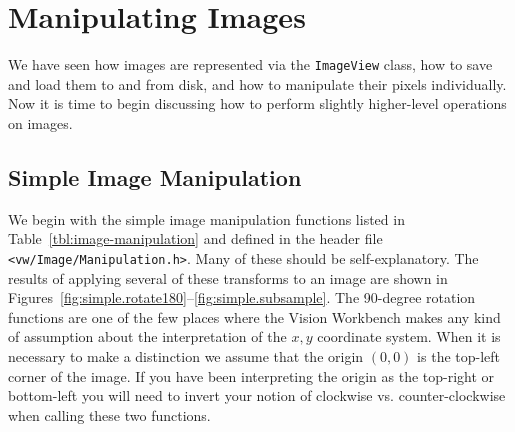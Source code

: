 \section{Manipulating Images}

We have seen how images are represented via the \verb#ImageView#
class, how to save and load them to and from disk, and how to
manipulate their pixels individually.  Now it is time to begin 
discussing how to perform slightly higher-level operations on images.

\subsection{Simple Image Manipulation}
\label{sec:simple-image-manipulation}

We begin with the simple image manipulation functions listed in
Table~\ref{tbl:image-manipulation} and defined in the header file
\verb#<vw/Image/Manipulation.h>#.  Many of these should be
self-explanatory.  The results of applying several of these transforms
to an image are shown in
Figures~\ref{fig:simple.rotate180}--\ref{fig:simple.subsample}.  The
90-degree rotation functions are one of the few places where the
Vision Workbench makes any kind of assumption about the interpretation
of the $x,y$ coordinate system.  When it is necessary to make a
distinction we assume that the origin $(0,0)$ is the top-left corner
of the image.  If you have been interpreting the origin as the
top-right or bottom-left you will need to invert your notion of
clockwise vs. counter-clockwise when calling these two functions.


